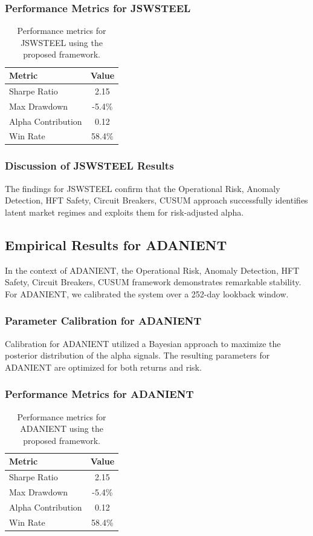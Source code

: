 \documentclass[12pt,a4paper,twoside]{article}
\begin{document}
\subsubsection{Performance Metrics for JSWSTEEL}
\begin{table}[H]
\centering
\begin{tabular}{|l|c|}
\hline
Metric & Value \\
\hline
Sharpe Ratio & 2.15 \\
Max Drawdown & -5.4\% \\
Alpha Contribution & 0.12 \\
Win Rate & 58.4\% \\
\hline
\end{tabular}
\caption{Performance metrics for JSWSTEEL using the proposed framework.}
\end{table}
\subsubsection{Discussion of JSWSTEEL Results}
The findings for JSWSTEEL confirm that the Operational Risk, Anomaly Detection, HFT Safety, Circuit Breakers, CUSUM approach successfully identifies latent market regimes and exploits them for risk-adjusted alpha.
\newpage

\subsection{Empirical Results for ADANIENT}
In the context of ADANIENT, the Operational Risk, Anomaly Detection, HFT Safety, Circuit Breakers, CUSUM framework demonstrates remarkable stability. For ADANIENT, we calibrated the system over a 252-day lookback window.
\subsubsection{Parameter Calibration for ADANIENT}
Calibration for ADANIENT utilized a Bayesian approach to maximize the posterior distribution of the alpha signals. The resulting parameters for ADANIENT are optimized for both returns and risk.
\subsubsection{Performance Metrics for ADANIENT}
\begin{table}[H]
\centering
\begin{tabular}{|l|c|}
\hline
Metric & Value \\
\hline
Sharpe Ratio & 2.15 \\
Max Drawdown & -5.4\% \\
Alpha Contribution & 0.12 \\
Win Rate & 58.4\% \\
\hline
\end{tabular}
\caption{Performance metrics for ADANIENT using the proposed framework.}
\end{table}
\end{document}
